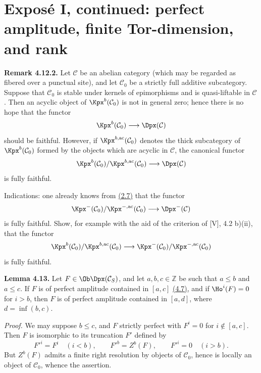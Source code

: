 \providecommand{\Add}{\operatorname{Add}}
\providecommand{\Cart}{\operatorname{Cart}}
\providecommand{\perfamp}{\operatorname{perf.amp}}
\providecommand{\perfdim}{\operatorname{perf.dim}}
\providecommand{\toramp}{\operatorname{tor.amp}}
\providecommand{\torf}{\operatorname{torf}}
\providecommand{\injf}{\operatorname{injf}}
\providecommand{\rg}{\operatorname{rg}}
\providecommand{\is}{\mathrm{is}}
\providecommand{\Mod}{\operatorname{Mod}}


\section*{Exposé I, continued: perfect amplitude, finite Tor-dimension, and rank}

\textbf{Remark 4.12.2.} Let \(\mathcal C\) be an abelian category (which may be regarded as fibered over a punctual site), and let \(\mathcal C_0\) be a strictly full additive subcategory. Suppose that \(\mathcal C_0\) is stable under kernels of epimorphisms and is quasi-liftable in \(\mathcal C\). Then an acyclic object of \(\Kpx^b(\mathcal C_0)\) is not in general zero; hence there is no hope that the functor
\[
  \Kpx^b(\mathcal C_0)\longrightarrow \Dpx(\mathcal C)
\]
should be faithful. However, if \(\Kpx^{b,\mathrm{ac}}(\mathcal C_0)\) denotes the thick subcategory of \(\Kpx^b(\mathcal C_0)\) formed by the objects which are acyclic in \(\mathcal C\), the canonical functor
\[
  \Kpx^b(\mathcal C_0)/\Kpx^{b,\mathrm{ac}}(\mathcal C_0)
  \longrightarrow \Dpx(\mathcal C)
\]
is fully faithful.

Indications: one already knows from \hyperlink{sga6.e01.prop.2-7}{(2.7)} that the functor
\[
  \Kpx^-(\mathcal C_0)/\Kpx^{-,\mathrm{ac}}(\mathcal C_0)
  \longrightarrow \Dpx^-(\mathcal C)
\]
is fully faithful. Show, for example with the aid of the criterion of [V], 4.2 b)(ii), that the functor
\[
  \Kpx^b(\mathcal C_0)/\Kpx^{b,\mathrm{ac}}(\mathcal C_0)
  \longrightarrow
  \Kpx^-(\mathcal C_0)/\Kpx^{-,\mathrm{ac}}(\mathcal C_0)
\]
is fully faithful.

\textbf{Lemma 4.13.} Let \(F\in\Ob \Dpx(\mathcal C_S)\), and let \(a,b,c\in\mathbb Z\) be such that \(a\leq b\) and \(a\leq c\). If \(F\) is of perfect amplitude contained in \([a,c]\) \hyperlink{sga6.e01.def.4-7}{(4.7)}, and if \(\Ho^i(F)=0\) for \(i>b\), then \(F\) is of perfect amplitude contained in \([a,d]\), where \(d=\inf(b,c)\).

\emph{Proof.} We may suppose \(b\leq c\), and \(F\) strictly perfect with \(F^i=0\) for \(i\notin [a,c]\). Then \(F\) is isomorphic to its truncation \(F'\) defined by
\[
  F'^i=F^i\quad (i<b),\qquad F'^b=Z^b(F),\qquad F'^i=0\quad (i>b).
\]
But \(Z^b(F)\) admits a finite right resolution by objects of \(\mathcal C_0\), hence is locally an object of \(\mathcal C_0\), whence the assertion.

